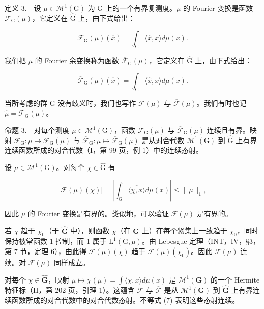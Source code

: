 定义 3.　设 \(\mu \in \mathcal{M}^{1}(\mathrm{G})\) 为 G 上的一个有界复测度。\(\mu\) 的 Fourier 变换是函数 \(\mathcal{F}_{\mathrm{G}}(\mu)\)，它定义在 \(\widehat{\mathrm{G}}\) 上，由下式给出：

\[
\mathcal {F} _ {\mathrm{G}} (\mu) (\widehat {x}) = \int_ {\mathrm{G}} \overline {{\langle \widehat {x} , x \rangle}} d \mu (x).\tag{5}
\]

我们把 \(\mu\) 的 Fourier 余变换称为函数 \(\overline{\mathcal{F}}_{\mathrm{G}}(\mu)\)，它定义在 \(\widehat{\mathrm{G}}\) 上，由下式给出：

\[
\overline {{\mathcal {F}}} _ {\mathrm{G}} (\mu) (\widehat {x}) = \int_ {\mathrm{G}} \langle \widehat {x}, x \rangle d \mu (x).\tag{6}
\]

当所考虑的群 G 没有歧义时，我们也写作 \(\mathcal{F}(\mu)\) 与 \(\overline{\mathcal{F}}(\mu)\)。我们有时也记 \(\widehat{\mu} = \mathcal{F}_{\mathrm{G}}(\mu)\)。

命题 3.　对每个测度 \(\mu \in \mathcal{M}^{1}(\mathrm{G})\)，函数 \(\mathcal{F}_{\mathrm{G}}(\mu)\) 与 \(\overline{\mathcal{F}}_{\mathrm{G}}(\mu)\) 连续且有界。映射 \(\mathcal{F}_{\mathrm{G}}: \mu \mapsto \mathcal{F}_{\mathrm{G}}(\mu)\) 与 \(\overline{\mathcal{F}}_{\mathrm{G}}: \mu \mapsto \overline{\mathcal{F}}_{\mathrm{G}}(\mu)\) 是从对合代数 \(\mathcal{M}^{1}(\mathrm{G})\) 到 \(\widehat{\mathrm{G}}\) 上有界连续函数所成的对合代数（I，第 99 页，例 1）中的连续态射。

设 \(\mu \in \mathcal{M}^1 (\mathrm{G})\)。对每个 \(\chi \in \widehat{\mathrm{G}}\) 有

\[
| \mathcal {F} (\mu) (\chi) | = \left| \int_ {\mathrm{G}} \overline {{\langle \chi , x \rangle}} d \mu (x) \right| \leqslant \| \mu \| _ {1},\tag{7}
\]

因此 \(\mu\) 的 Fourier 变换是有界的。类似地，可以验证 \(\overline{\mathcal{F}}(\mu)\) 是有界的。

若 \(\chi\) 趋于 \(\chi_0\)（于 \(\widehat{\mathbf{G}}\) 中），则函数 \(\chi\)（在 \(\mathbf{G}\) 上）在每个紧集上一致趋于 \(\chi_0\)，同时保持被常函数 1 控制，而 1 属于 \(\mathrm{L}^1 (\mathrm{G},\mu)\)。由 Lebesgue 定理（INT，IV，§3，第 7 节，定理 6），由此得 \(\mathcal{F}(\mu)(\chi)\) 趋于 \(\mathcal{F}(\mu)(\chi_0)\)。因此 \(\mathcal{F}(\mu)\) 连续。对 \(\overline{\mathcal{F}} (\mu)\) 同样成立。

对每个 \(\chi \in \widehat{\mathbf{G}}\)，映射 \(\mu \mapsto \chi(\mu) = \int \langle \chi, x \rangle d\mu(x)\) 是 \(\mathcal{M}^1(\mathbf{G})\) 的一个 Hermite 特征标（II，第 202 页，引理 1）。这蕴含 \(\mathcal{F}\) 与 \(\overline{\mathcal{F}}\) 是从 \(\mathcal{M}^1(\mathbf{G})\) 到 \(\widehat{\mathbf{G}}\) 上有界连续函数所成的对合代数中的对合代数态射。不等式 (7) 表明这些态射连续。

